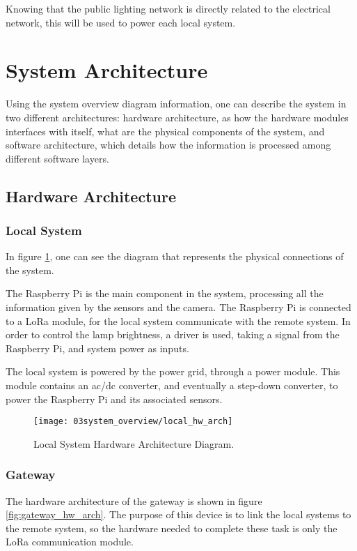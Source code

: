 Knowing that the public lighting network is directly related to the electrical network, this will be used to power each local system.

\section{System Architecture}
Using the system overview diagram information, one can describe the system in two different architectures: hardware architecture, as how the hardware modules interfaces with itself, what are the physical components of the system, and software architecture, which details how the information is processed among different software layers.

\subsection{Hardware Architecture}

\subsubsection{Local System}

In figure \ref{fig:local_hw_arch}, one can see the diagram that represents the physical connections of the system.

The Raspberry Pi is the main component in the system, processing all the information given by the sensors and the camera. The Raspberry Pi is connected to a LoRa module, for the local system communicate with the remote system. In order to control the lamp brightness, a driver is used, taking a signal from the Raspberry Pi, and system power as inputs.

The local system is powered by the power grid, through a power module. This module contains an \ac{ac}/\ac{dc} converter, and eventually a step-down converter, to power the Raspberry Pi and its associated sensors.

\begin{figure}[ht]
	\centering
	\texttt{[image: 03system\_overview/local\_hw\_arch]}
	\caption{Local System Hardware Architecture Diagram.}
	\label{fig:local_hw_arch}
\end{figure}

\subsubsection{Gateway}

The hardware architecture of the gateway is shown in figure \ref{fig:gateway_hw_arch}. The purpose of this device is to  link the local systems to the remote system, so the hardware needed to complete these task is only the LoRa communication module.

